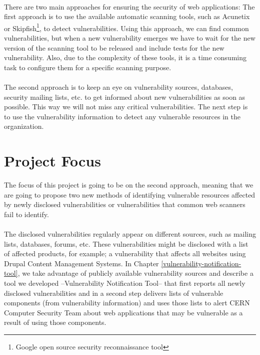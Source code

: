 \paragraph{}
There are two main approaches for ensuring the security of web applications: The first approach is to use the available automatic scanning tools, such as Acunetix or Skipfish\footnote{Google open source security reconnaissance tool}, to detect vulnerabilities. Using this approach, we can find common vulnerabilities, but when a new vulnerability emerges we have to wait for the new version of the scanning tool to be released and include tests for the new vulnerability. Also, due to the complexity of these tools, it is a time consuming task to configure them for a specific scanning purpose. 
\paragraph{}
The second approach is to keep an eye on vulnerability sources, databases, security mailing lists, etc. to get informed about new vulnerabilities as soon as possible. This way we will not miss any critical vulnerabilities. The next step is to use the vulnerability information to detect any vulnerable resources in the organization. 
\section{Project Focus}
The focus of this project is going to be on the second approach, meaning that we are going to propose two new methods of identifying vulnerable resources affected by newly disclosed vulnerabilities or vulnerabilities that common web scanners fail to identify. 
\paragraph{}
The disclosed vulnerabilities regularly appear on different sources, such as mailing lists, databases, forums, etc. These vulnerabilities might be disclosed with a list of affected products, for example; a vulnerability that affects all websites using Drupal Content Management Systems. In Chapter \ref{vulnerability-notification-tool}, we take advantage of publicly available vulnerability sources and describe a tool we developed --Vulnerability Notification Tool-- that first reports all newly disclosed vulnerabilities and in a second step delivers lists of vulnerable components (from vulnerability information) and uses those lists to alert CERN Computer Security Team about web applications that may be vulnerable as a result of using those components.
